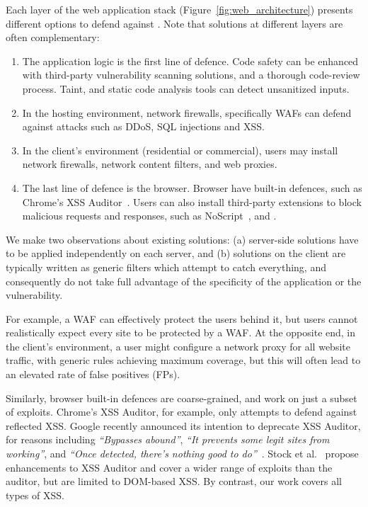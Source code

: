Each layer of the web application stack (Figure~\ref{fig:web_architecture}) presents different options to defend against \xss. Note that solutions at different layers are often complementary:
\begin{enumerate}

\item The application logic is the first line of defence.
  Code safety can be enhanced with third-party vulnerability scanning solutions, and a thorough
  code-review process. Taint, and static code analysis tools can detect unsanitized inputs.

\item In the hosting environment, network firewalls, specifically \acp{WAF} can defend against attacks such as \ac{DDoS}, \ac{SQL} injections and \ac{XSS}.

\item In the client's environment (residential or commercial), users may install network firewalls, network content filters, and web proxies.

\item The last line of defence is the browser.
  Browser have built-in defences, such as
  Chrome's \ac{XSS} Auditor~\cite{xssauditor}. Users can also
  install third-party extensions to block malicious requests and
  responses, such as NoScript~\cite{Noscript}, and \sys.
\end{enumerate}

We make two observations about existing solutions: (a) server-side
solutions have to be applied independently on each server, and (b)
solutions on the client are typically written as generic filters which
attempt to catch everything, and consequently do not take full advantage
of the specificity of the application or the vulnerability.

For example, a \ac{WAF} can effectively protect the users
behind it, but users cannot realistically expect every site to
be protected by a \ac{WAF}. At the opposite end, in the client's
environment, a user might configure a network proxy for all website
traffic, with generic rules achieving maximum coverage, but this
will often lead to an elevated rate of false positives (FPs).

Similarly, browser built-in defences are coarse-grained, and 
work on just a subset of exploits. Chrome's XSS Auditor, for example, only
attempts to defend against reflected \ac{XSS}. Google recently
announced its intention to deprecate XSS Auditor, for reasons
including \emph{``Bypasses abound''}, \emph{``It prevents some legit
  sites from working''}, and \emph{``Once detected, there's nothing
  good to do''}~\cite{deprecatexssauditor}. Stock et
al.~\cite{precise_dom_xss} propose enhancements to XSS Auditor and
cover a wider range of exploits than the auditor, but are limited to
DOM-based \ac{XSS}.  By contrast, our work covers all types of \ac{XSS}.

